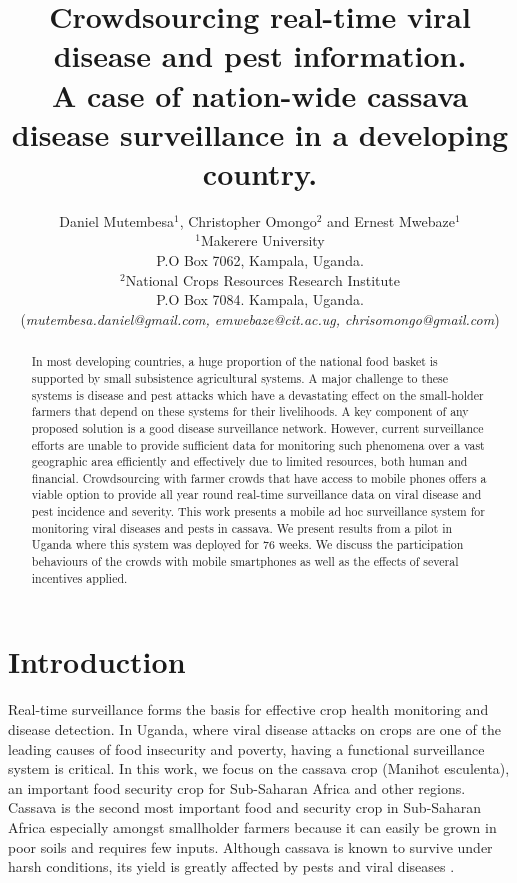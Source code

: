 \documentclass[letterpaper]{article} %
\begin{document}
\title{Crowdsourcing real-time viral disease and pest information.\\
A case of nation-wide cassava disease surveillance in a developing country.}
\author{Daniel Mutembesa$^{1}$, Christopher Omongo$^{2}$ and Ernest Mwebaze$^{1}$\\
$^{1}$Makerere University\\
P.O Box 7062, Kampala, Uganda.\\
$^{2}$National Crops Resources Research Institute\\ P.O Box 7084. Kampala, Uganda.\\
(\emph{mutembesa.daniel@gmail.com, emwebaze@cit.ac.ug, chrisomongo@gmail.com})
}

\maketitle
\begin{abstract}
In most developing countries, a huge proportion of the national food basket is supported by small subsistence agricultural systems. A major challenge to these systems is disease and pest attacks which have a devastating effect on the small-holder farmers that depend on these systems for their livelihoods. A key component of any proposed solution is a good disease surveillance network. However, current surveillance efforts are unable to provide sufficient data for monitoring such phenomena over a vast geographic area efficiently and effectively due to limited resources, both human and financial. Crowdsourcing with farmer crowds that have access to mobile phones offers a viable option to provide all year round real-time surveillance data on viral disease and pest incidence and severity. This work presents a mobile ad hoc surveillance system for monitoring viral diseases and pests  in cassava. We present results from a pilot in Uganda where this system was deployed for 76 weeks. We discuss the participation behaviours of the crowds with mobile smartphones as well as the effects of several incentives applied.


\end{abstract}


\section{Introduction}
Real-time surveillance forms the basis for effective crop health monitoring and disease detection. In Uganda, where viral disease attacks on crops are one of the leading causes of food insecurity and poverty, having a functional surveillance system is critical. In this work, we focus on the cassava crop (Manihot esculenta), an important food security crop for Sub-Saharan Africa and other regions. Cassava is the second most important food and security crop in Sub-Saharan Africa especially amongst smallholder farmers because it can easily be grown in poor soils and requires few inputs. Although cassava is known to survive under harsh conditions, its yield is greatly affected by pests and viral diseases \cite{ephraim2015,otim2000current}.
\end{document}
